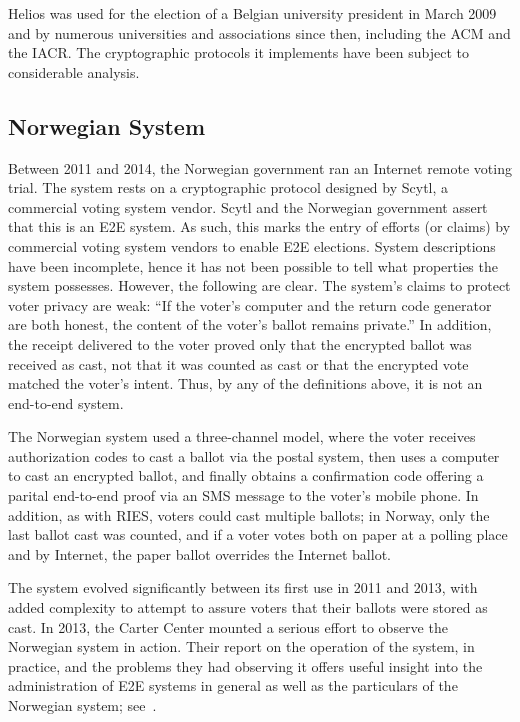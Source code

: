 Helios was used for the election of a Belgian university president in March
2009 and by numerous universities and associations since then, including the
ACM and the IACR. The cryptographic protocols it implements have been
subject to considerable analysis.

\subsection{Norwegian System~\cite{gjosteen2012}}

Between 2011 and 2014, the Norwegian government ran an Internet remote
voting trial.  The system rests on a cryptographic protocol designed by
Scytl, a commercial voting system vendor. Scytl and the Norwegian government
assert that this is an E2E system.  As such, this marks the entry of efforts
(or claims) by commercial voting system vendors to enable E2E elections.
System descriptions have been incomplete, hence it has not been possible to
tell what properties the system possesses. However, the following are clear.
The system's claims to protect voter privacy are weak: ``If the voter's
computer and the return code generator are both honest, the content of the
voter's ballot remains private.''  In addition, the receipt delivered to the
voter proved only that the encrypted ballot was received as cast, not that
it was counted as cast or that the encrypted vote matched the voter's
intent. Thus, by any of the definitions above, it is not an end-to-end
system.

The Norwegian system used a three-channel model, where the voter receives
authorization codes to cast a ballot via the postal system, then uses a
computer to cast an encrypted ballot, and finally obtains a confirmation
code offering a parital end-to-end proof via an SMS message to the voter's
mobile phone.  In addition, as with RIES, voters could cast multiple
ballots; in Norway, only the last ballot cast was counted, and if a voter
votes both on paper at a polling place and by Internet, the paper ballot
overrides the Internet ballot.

The system evolved significantly between its first use in 2011 and 2013,
with added complexity to attempt to assure voters that their ballots were
stored as cast.  In 2013, the Carter Center mounted a serious effort to
observe the Norwegian system in action.  Their report on the operation of
the system, in practice, and the problems they had observing it offers
useful insight into the administration of E2E systems in general as well as
the particulars of the Norwegian system; see~\cite{carter2013}.

